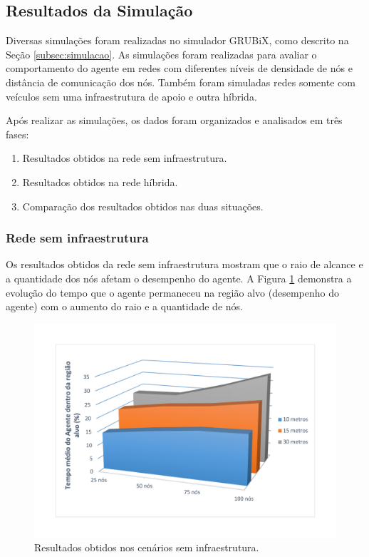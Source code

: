 \subsection{Resultados da Simulação}
\label{subsec:resultadoSimulacao}

	Diversas simulações foram realizadas no simulador GRUBiX, como descrito na Seção \ref{subsec:simulacao}. As simulações foram realizadas para avaliar o comportamento do agente em redes com diferentes níveis de densidade de nós e distância de comunicação dos nós. Também foram simuladas redes somente com veículos sem uma infraestrutura de apoio e outra híbrida.

	Após realizar as simulações, os dados foram organizados e analisados em três fases:

	\begin{enumerate}
		\item Resultados obtidos na rede sem infraestrutura.
		\item Resultados obtidos na rede híbrida.
		\item Comparação dos resultados obtidos nas duas situações.
	\end{enumerate} 

	\subsubsection{Rede sem infraestrutura}
	\label{subsubsection:redeSemInfraestruturaResultadoDiscucao}

	Os resultados obtidos da rede sem infraestrutura mostram que o raio de alcance e a quantidade dos nós afetam o desempenho do agente. A Figura \ref{fig:graficosSemTorres} demonstra a evolução do tempo que o agente permaneceu na região alvo (desempenho do agente) com o aumento do raio e a quantidade de nós. 

	\begin{figure}[htbp]
		\centering
		\includegraphics[scale=0.34]{resultados/graficos/graficoSemTorres.pdf}
		\caption{Resultados obtidos nos cenários sem infraestrutura.}
		\label{fig:graficosSemTorres}
	\end{figure}

